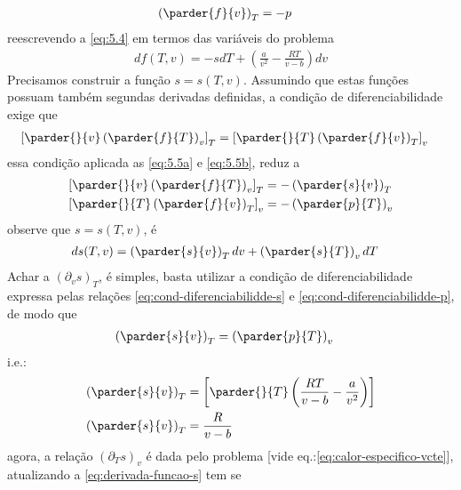 \begin{prob}
\begin{sol}
\begin{subequations}
\begin{align}
					\left(\parder{f}{v}\right)_T&=-p\label{eq:5.5b}
			\end{align}
		\end{subequations}
		reescrevendo a \eqref{eq:5.4} em termos das variáveis do problema
		\begin{align}
			\label{eq:5.6}
			df(T,v)=-sdT+\left(\frac{a}{v^2}-\frac{RT}{v-b}\right)dv
		\end{align}
		Precisamos construir a função $s=s(T,v)$. Assumindo que estas funções possuam também segundas derivadas definidas, a condição de diferenciabilidade exige que
		\begin{align}
			\left[\parder{}{v}\left(\parder{f}{T}\right)_v\right]_T&=\left[\parder{}{T}\left(\parder{f}{v}\right)_T\right]_v
		\end{align}
		essa condição aplicada as \eqref{eq:5.5a} e \eqref{eq:5.5b}, reduz a
		\begin{subequations}
			\begin{align}
				\left[\parder{}{v}\left(\parder{f}{T}\right)_v\right]_T&=-\left(\parder{s}{v}\right)_T \label{eq:cond-diferenciabilidde-s}\\			
				\left[\parder{}{T}\left(\parder{f}{v}\right)_T\right]_v&=-\left(\parder{p}{T}\right)_v \label{eq:cond-diferenciabilidde-p}
			\end{align}
		\end{subequations}
		observe que $s=s(T,v)$, é
		\begin{align}
			\label{eq:derivada-funcao-s}
			ds(T,v)&=\left(\parder{s}{v}\right)_Tdv+\left(\parder{s}{T}\right)_vdT
		\end{align}
		Achar a $(\partial_vs)_T$, é simples, basta utilizar a condição de diferenciabilidade expressa pelas relações \eqref{eq:cond-diferenciabilidde-s} e \eqref{eq:cond-diferenciabilidde-p}, de modo que
		\begin{align}
			\left(\parder{s}{v}\right)_T&=\left(\parder{p}{T}\right)_v
		\end{align} 
		i.e.:
		\begin{align}
			\begin{split}
				\label{eq:s-funcao-v}
				\left(\parder{s}{v}\right)_T&=\left[\parder{}{T}\left(\frac{RT}{v-b}-\frac{a}{v^2}\right)\right]\\
				\left(\parder{s}{v}\right)_T&=\frac{R}{v-b}
			\end{split}
		\end{align}
		agora, a relação $(\partial_Ts)_v$ é dada pelo problema [vide eq.:\eqref{eq:calor-especifico-vcte}], atualizando a \eqref{eq:derivada-funcao-s} tem se

\end{sol}
\end{prob}

